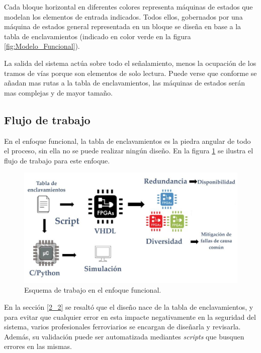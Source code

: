 		\vspace{10cm}
		
		Cada bloque horizontal en diferentes colores representa máquinas de estados que modelan los elementos de entrada indicados. Todos ellos, gobernados por una máquina de estados general representada en un bloque se diseña en base a la tabla de enclavamientos (indicado en color verde en la figura \ref{fig:Modelo_Funcional}). 	
		
		La salida del sistema actúa sobre todo el señalamiento, menos la ocupación de los tramos de vías porque son elementos de solo lectura. Puede verse que conforme se añadan mas rutas a la tabla de enclavamientos, las máquinas de estados serán mas complejas y de mayor tamaño.
	
	\subsection{Flujo de trabajo}
		
		En el enfoque funcional, la tabla de enclavamientos es la piedra angular de todo el proceso, sin ella no se puede realizar ningún diseño. En la figura \ref{fig:Work_Funcional} se ilustra el flujo de trabajo para este enfoque.		
			
		\begin{figure}[h]
		\centering
			\includegraphics[scale=.5]{./Figures/Funcional_workflow}
			\caption{Esquema de trabajo en el enfoque funcional.}
			\label{fig:Work_Funcional}
		\end{figure}
	
		En la sección \ref{2_2} se resaltó que el diseño nace de la tabla de enclavamientos, y para evitar que cualquier error en esta impacte negativamente en la seguridad del sistema, varios profesionales ferroviarios se encargan de diseñarla y revisarla. Además, su validación puede ser automatizada mediantes \textit{scripts} que busquen errores en las mismas.
		
